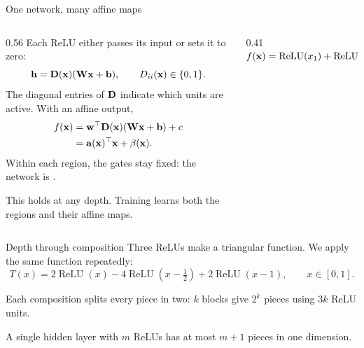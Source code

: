 \begin{frame}{One network, many affine maps}
	\small
	\setlength{\abovedisplayskip}{6pt}\setlength{\belowdisplayskip}{6pt}
	\begin{columns}[c,onlytextwidth]
		\begin{column}{0.56\textwidth}
			Each ReLU either passes its input or sets it to zero:
			\[
				\boldsymbol{\mathbf{h}}=\boldsymbol{\mathbf{D}}(\boldsymbol{\mathbf{x}})(\boldsymbol{\mathbf{W}}\boldsymbol{\mathbf{x}}+\boldsymbol{\mathbf{b}}),
				\qquad D_{ii}(\boldsymbol{\mathbf{x}})\in\{0,1\}.
			\]
			The diagonal entries of $\boldsymbol{\mathbf{D}}$ indicate which units are active. With an affine output,
			\begin{align*}
				f(\boldsymbol{\mathbf{x}}) & =\boldsymbol{\mathbf{w}}^{\top}\boldsymbol{\mathbf{D}}(\boldsymbol{\mathbf{x}})(\boldsymbol{\mathbf{W}}\boldsymbol{\mathbf{x}}+\boldsymbol{\mathbf{b}})+c \\
				          & =\boldsymbol{\mathbf{a}}(\boldsymbol{\mathbf{x}})^{\top}\boldsymbol{\mathbf{x}}+\beta(\boldsymbol{\mathbf{x}}).
			\end{align*}
			Within each region, the gates stay fixed: the network is .

			\medskip
			This holds at any depth. Training learns both the regions and their affine maps.
		\end{column}
		\begin{column}{0.41\textwidth}
			\centering
			$f(\boldsymbol{\mathbf{x}})=\operatorname{ReLU}(x_1)+\operatorname{ReLU}(x_2-x_1)$\par
			\smallskip
			
		\end{column}
	\end{columns}
\end{frame}

\begin{frame}{Depth through composition}
	\small
	\setlength{\abovedisplayskip}{5pt}\setlength{\belowdisplayskip}{5pt}
	Three ReLUs make a triangular function. We apply the same function repeatedly:
	\[
		T(x)=2\operatorname{ReLU}(x)-4\operatorname{ReLU}\!\left(x-\tfrac12\right)
		+2\operatorname{ReLU}(x-1),\qquad x\in[0,1].
	\]
	\begin{center}
		
	\end{center}
	Each composition splits every piece in two: $k$ blocks give $2^k$ pieces using $3k$ ReLU units.

	\smallskip
	A single hidden layer with $m$ ReLUs has at most $m+1$ pieces in one dimension.

\end{frame}

